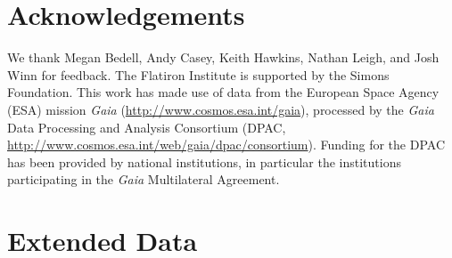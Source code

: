 \documentclass[12pt,letterpaper,margin=1in]{article}
\begin{document}


\section{Acknowledgements}
We thank Megan Bedell, Andy Casey, Keith Hawkins, Nathan Leigh, and Josh Winn
for feedback.
The Flatiron Institute is supported by the Simons Foundation.
This work has made use of data from the European Space Agency (ESA) mission
{\it Gaia} (\url{http://www.cosmos.esa.int/gaia}), processed by the {\it Gaia}
Data Processing and Analysis Consortium (DPAC,
\url{http://www.cosmos.esa.int/web/gaia/dpac/consortium}). Funding for the DPAC
has been provided by national institutions, in particular the institutions
participating in the {\it Gaia} Multilateral Agreement.


\section{Extended Data}
\end{document}
